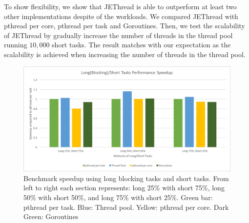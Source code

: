 \documentclass[journal, a4paper]{IEEEtran}
\begin{document}
To show flexibility, we show that JEThread is able to outperform at least two other implementations despite of the workloads. We compared JEThread with pthread per core, pthread per task and Goroutines. Then, we test the scalability of JEThread by gradually increase the number of threads in the thread pool running $10,000$ short tasks. The result matches with our expectation as the scalability is achieved when increasing the number of threads in the thread pool.\\


\begin{figure}[!hbt]
		\begin{center}
		\includegraphics[width=\columnwidth]{test_1.png}
		\caption{Benchmark speedup using long blocking tasks and short tasks. From left to right each section represents: long 25\% with short 75\%, long 50\% with short 50\%, and long 75\% with short 25\%. Green bar: pthread per task. Blue: Thread pool. Yellow: pthread per core. Dark Green: Goroutines}
		\label{fig:tf_plot}
		\end{center}
	\end{figure}
	
\end{document}
